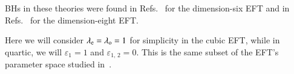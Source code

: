 \documentclass[twocolumn,
               prd,
               aps,
               superscriptaddress,
               tightenlines,
               nofootinbib,
               eqsecnum,
               amsfonts,
               amsmath,
               longbibliography]{revtex4-1}
\newcommand{\lame}{\lambda_{\rm e}}
\newcommand{\lamo}{\lambda_{\rm o}}
\begin{document}
BHs in these theories were found in Refs.~\cite{deRham:2020ejn,Cano:2020cao} for the dimension-six EFT
and in Refs.~\cite{Cardoso:2018ptl} for the dimension-eight EFT.

Here we will consider $\lame = \lamo = 1$ for simplicity in the cubic EFT, while in quartic,
we will $\varepsilon_{1} = 1$ and $\varepsilon_{1,\,2} = 0$. This is the same subset of the EFT's parameter
space studied in~\cite{Sennett:2019bpc}.


%
%
\end{document}
